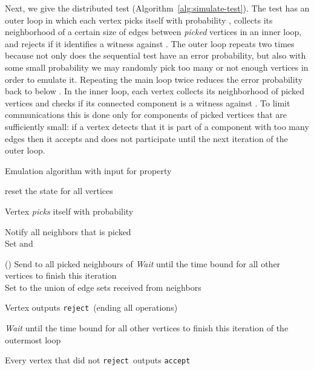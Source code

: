 \documentclass[11pt]{article}
\newcommand{\accept}{\texttt{accept}}
\newcommand{\reject}{\texttt{reject}}
\begin{document}
Next, we give the distributed test (Algorithm~\ref{alg:simulate-test}). The test has an outer loop
in which each vertex picks itself with probability , collects its neighborhood of a certain
size of edges between \emph{picked} vertices in an inner loop, and rejects if it identifies a
witness against . The outer loop repeats two times because not only does the sequential test have
an error probability, but also with some small probability we may randomly pick too many or not
enough vertices in order to emulate it. Repeating the main loop twice reduces the error probability
back to below . In the inner loop, each vertex collects its neighborhood of picked vertices and
checks if its connected component is a witness against . To limit communications this is done
only for components of picked vertices that are sufficiently small: if a vertex detects that it is
part of a component with too many edges then it accepts and does not participate until the next
iteration of the outer loop.

\begin{algorithm}[htbp]
\caption{Emulation algorithm with input  for property 
\label{alg:simulate-test}}
\Perform{}
{
	reset the state for all vertices\\
			
	{
Vertex  \textit{picks} itself with probability \\
		{
			Notify all neighbors that  is picked\\
			Set  and \\
					
			\Perform{}
			{
						
				\If(){}
				{
					Send  to all picked neighbours of  
				}
				\textit{Wait} until the time bound for all other vertices to finish this iteration\\
				Set  to the union of edge sets received from neighbors
			}
			{
				Vertex  outputs \reject ~(ending all operations)
			}
		}
		\Else
		{
			\textit{Wait} until the time bound for all other vertices to finish this iteration of the outermost loop
		}
	}
}
Every vertex  that did not \reject~outputs \accept

\end{algorithm}
	
\end{document}
